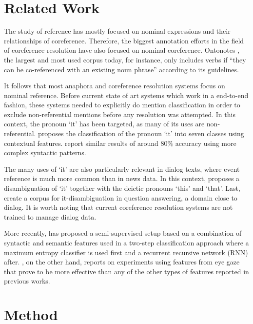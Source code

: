 \documentclass[10pt, a4paper]{article} \usepackage{lrec} \usepackage{multibib}
\begin{document}
\section{Related Work}

The study of reference has mostly focused on nominal expressions and their
relationships of coreference. Therefore, the biggest annotation efforts in the
field of coreference resolution have also focused on nominal coreference.
Ontonotes \cite{pradhan-xue-2009-ontonotes}, the largest and most used corpus today, 
for instance, only includes verbs if ``they can be co-referenced with an
existing noun phrase'' according to its guidelines.

%
% 
It follows that most anaphora and coreference resolution systems focus on
nominal reference. Before current state of art systems which work in a
end-to-end fashion, these systems needed to explicitly do mention classification
in order to exclude non-referential mentions before any resolution was attempted.
In this context, the pronoun `it' has been targeted, as many of its uses are
non-referential. \cite{Evans2001} proposes the classification of the pronoun `it' into seven
classes using contextual features. \cite{Boyd2005} report similar results of
around 80\% accuracy using more complex syntactic patterns.

The many uses of `it' are also particularly relevant in dialog texts, where event reference is much more common than in news data. In this context, \cite{muller-2007-resolving} proposes a disambiguation of `it' together with the deictic pronouns `this' and `that'.  Last, \cite{Lee2016} create a corpus for it-disambiguation in question answering, a domain close to dialog. It is worth noting that current coreference resolution systems are not trained to manage dialog data.

More recently,  \cite{Loaiciga2017itrnn} has proposed a semi-supervised setup based on a
combination of syntactic and semantic features used in a two-step classification
approach where a maximum entropy classifier is used first and a recurrent
recursive network (RNN) after. \cite{yaneva-etal-2018-classifying}, on the other
hand, reports on experiments using features from eye gaze that prove to be more
effective than any of the other types of features reported in previous works.




\section{Method}
\end{document}
